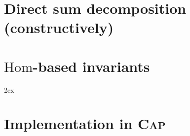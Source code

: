 \documentclass{article}
\begin{document}
\newpage
\section{Direct sum decomposition (constructively)}


\newpage
\section{$\mathrm{Hom}$-based invariants}




\newpage

\begingroup
     \parindent 0pt
     \parskip 2ex
     \def\enotesize{\normalsize}
     \theendnotes
\endgroup 



\appendix
\renewcommand{\thesection}{\Alph{section}}
\section{Implementation in \textsc{Cap}}

\end{document}
